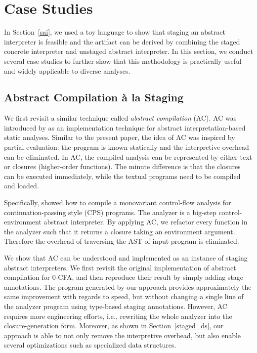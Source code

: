 \section{Case Studies} \label{cases_study}

In Section~\ref{sai}, we used a toy language to show that staging an abstract
interpreter is feasible and the artifact can be derived by combining the staged
concrete interpreter and unstaged abstract interpreter.
In this section, we conduct several case studies to further show that this
methodology is practically useful and widely applicable to diverse analyses.

\subsection{Abstract Compilation \`a la Staging} \label{cs_ac}

We first revisit a similar technique called \textit{abstract compilation} (AC).
AC was introduced by \citet{Boucher:1996:ACN:647473.727587} as an
implementation technique for abstract interpretation-based static analyses.
Similar to the present paper, the idea of AC was inspired by partial evaluation:
the program is known statically and the interpretive overhead can be
eliminated. In AC, the compiled analysis can be represented by either text or
closures (higher-order functions). The minute difference is that the closures
can be executed immediately, while the textual programs need to be compiled and
loaded.

Specifically, \citeauthor{Boucher:1996:ACN:647473.727587} showed how to compile a
monovariant control-flow analysis \cite{Shivers:1991:SSC:115865.115884,
Shivers:1988:CFA:53990.54007} for continuation-passing style (CPS) programs.
The analyzer is a big-step control-environment abstract interpreter. 
By applying AC, we refactor every function in the analyzer such that it
returns a closure taking an environment argument.  Therefore the overhead
of traversing the AST of input program is eliminated.

We show that AC can be understood and implemented as an instance of staging abstract
interpreters. We first revisit the original implementation of abstract
compilation for 0-CFA, and then reproduce their result by simply adding stage
annotations.  The program generated by our approach provides approximately the
same improvement with regards to speed, but without changing a single line of
the analyzer program using type-based staging annotations. However, AC requires
more engineering efforts, i.e., rewriting the whole analyzer into the
closure-generation form. Moreover, as shown in Section~\ref{staged_ds}, our
approach is able to not only remove the interpretive overhead, but also enable
several optimizations such as specialized data structures.

